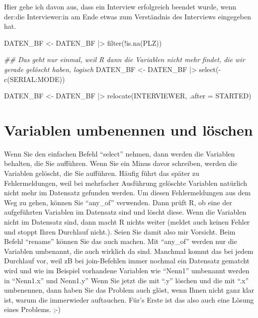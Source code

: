 \documentclass[twoside, pagesize, fontsize=11pt, dvipsnames]{scrreport}
\newenvironment{Shaded}{\begin{snugshade}}{\end{snugshade}}
\newcommand{\AttributeTok}[1]{\textcolor[rgb]{0.40,0.45,0.13}{#1}}
\newcommand{\DocumentationTok}[1]{\textcolor[rgb]{0.37,0.37,0.37}{\textit{#1}}}
\newcommand{\FunctionTok}[1]{\textcolor[rgb]{0.28,0.35,0.67}{#1}}
\newcommand{\NormalTok}[1]{\textcolor[rgb]{0.00,0.23,0.31}{#1}}
\newcommand{\OtherTok}[1]{\textcolor[rgb]{0.00,0.23,0.31}{#1}}
\newcommand{\SpecialCharTok}[1]{\textcolor[rgb]{0.37,0.37,0.37}{#1}}
\begin{document}
Hier gehe ich davon aus, dass ein Interview erfolgreich beendet wurde,
wenn der:die Interviewer:in am Ende etwas zum Verständnis des Interviews
eingegeben hat.

\begin{Shaded}
\begin{Highlighting}[]
\NormalTok{DATEN\_BF }\OtherTok{\textless{}{-}}\NormalTok{ DATEN\_BF }\SpecialCharTok{|\textgreater{}} 
  \FunctionTok{filter}\NormalTok{(}\SpecialCharTok{!}\FunctionTok{is.na}\NormalTok{(PLZ))}

\DocumentationTok{\#\# Das geht nur einmal, weil R dann die Variablen nicht mehr findet, die wir gerade gelöscht haben, logisch}
\NormalTok{DATEN\_BF }\OtherTok{\textless{}{-}}\NormalTok{ DATEN\_BF }\SpecialCharTok{|\textgreater{}} 
  \FunctionTok{select}\NormalTok{(}\SpecialCharTok{{-}}\FunctionTok{c}\NormalTok{(SERIAL}\SpecialCharTok{:}\NormalTok{MODE)) }

\NormalTok{DATEN\_BF }\OtherTok{\textless{}{-}}\NormalTok{ DATEN\_BF }\SpecialCharTok{|\textgreater{}} 
  \FunctionTok{relocate}\NormalTok{(INTERVIEWER, }\AttributeTok{.after =}\NormalTok{ STARTED)}
\end{Highlighting}
\end{Shaded}

\hypertarget{variablen-umbenennen-und-luxf6schen}{%
\section{Variablen umbenennen und
löschen}\label{variablen-umbenennen-und-luxf6schen}}

Wenn Sie den einfachen Befehl \enquote{select} nehmen, dann werden die
Variablen behalten, die Sie aufführen. Wenn Sie ein Minus davor
schreiben, werden die Variablen gelöscht, die Sie aufführen. Häufig
führt das später zu Fehlermeldungen, weil bei mehrfacher Ausführung
gelöschte Variablen natürlich nicht mehr im Datensatz gefunden werden.
Um diesen Fehlermeldungen aus dem Weg zu gehen, können Sie
\enquote{any\_of} verwenden. Dann prüft R, ob eine der aufgeführten
Variablen im Datensatz sind und löscht diese. Wenn die Variablen nicht
im Datensatz sind, dann macht R nichts weiter (meldet auch keinen Fehler
und stoppt Ihren Durchlauf nicht.). Seien Sie damit also mir Vorsicht.
Beim Befehl \enquote{rename} können Sie das auch machen. Mit
\enquote{any\_of} werden nur die Variablen umbenannt, die auch wirklich
da sind. Manchmal kommt das bei jedem Durchlauf vor, weil zB bei
join-Befehlen immer nochmal ein Datensatz gematcht wird und wie im
Beispiel vorhandene Variablen wie \enquote{Nenn1} umbenannt werden in
\enquote{Nenn1.x} und Nenn1.y'' Wenn Sie jetzt die mit \enquote{.y}
löschen und die mit \enquote{.x} umbenennen, dann haben Sie das Problem
auch glöst, wenn Ihnen nicht ganz klar ist, warum die immerwieder
auftauchen. Für's Erste ist das also auch eine Lösung eines Problems.
;-)
\end{document}
